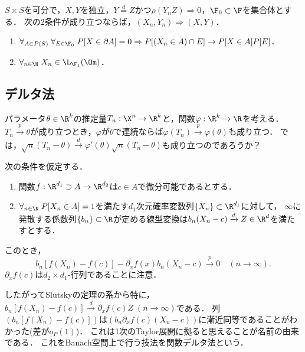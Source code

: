\documentclass[uplatex,dvipdfmx]{jsreport}
\begin{document}
\begin{theorem}
    $S\times S$を可分で，$X,Y$を独立，$Y\overset{d}{=}Z$かつ$\rho(Y_nZ)\Rightarrow0$，$\F_0\subset\F$を集合体とする．
    次の2条件が成り立つならば，$(X_n,Y_n)\Rightarrow(X,Y)$．
    \begin{enumerate}
        \item $\forall_{A\in P(S)}\;\forall_{E\in\F_0}\;P[X\in\partial A]=0\Rightarrow P[(X_n\in A)\cap E]\to P[X\in A]P[E]$．
        \item $\forall_{n\in\N}\;X_n\in\L_{\F_1}(\Om)$．
    \end{enumerate}
\end{theorem}

\subsection{デルタ法}

\begin{tcolorbox}[colframe=ForestGreen, colback=ForestGreen!10!white,breakable,colbacktitle=ForestGreen!40!white,coltitle=black,fonttitle=\bfseries\sffamily,
title=]
    パラメータ$\theta\in\R^k$の推定量$T_n:\X^n\to\R^k$と，関数$\varphi:\R^k\to\R$を考える．
    $T_n\xrightarrow{p}\theta$が成り立つとき，$\varphi$が$\theta$で連続ならば$\varphi(T_n)\xrightarrow{p}\varphi(\theta)$も成り立つ．
    では，$\sqrt{n}(T_n-\theta)\xrightarrow{d}\varphi'(\theta)\sqrt{n}(T_n-\theta)$も成り立つのであろうか？
\end{tcolorbox}

\begin{theorem}[デルタ法]\label{thm-delta-method}
    次の条件を仮定する．
    \begin{enumerate}[({D}1)]
        \item 関数$f:\R^{d_1}\supset A\to\R^{d_2}$は$c\in A$で微分可能であるとする．
        \item $\forall_{n\in\N}\;P[X_n\in A]=1$を満たす$d_1$次元確率変数列$\{X_n\}\subset\R^{d_1}$に対して，
        $\infty$に発散する係数列$\{b_n\}\subset\R$が定める線型変換は$b_n(X_n-c)\xrightarrow{d}Z\in\R^d$を満たすとする．
    \end{enumerate}
    このとき，
    \[b_n[f(X_n)-f(c)]-\partial_xf(x)b_n(X_n-c)\xrightarrow{p}0\quad(n\to\infty).\]
    $\partial_xf(c)$は$d_2\times d_1$-行列であることに注意．
\end{theorem}
\begin{remarks}
    したがってSlutskyの定理の系から特に，$b_n[f(X_n)-f(c)]\xrightarrow{d}\partial_xf(c)Z\;(n\to\infty)$である．
    列$(b_n[f(X_n)-f(c)])$は$(b_n\partial_xf(c)(X_n-c))$に漸近同等であることがわかった(差が$o_P(1)$)．
    これは1次のTaylor展開に拠ると思えることが名前の由来である．
    これをBanach空間上で行う技法を関数デルタ法という．
\end{remarks}
\end{document}
